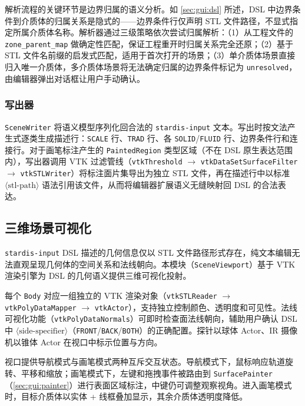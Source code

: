 解析流程的关键环节是边界归属的语义分析。如 \ref{sec:gui:dsl} 所述，DSL 中边界条件到介质体的归属关系是隐式的——边界条件行仅声明 STL 文件路径，不显式指定所属介质体名称。解析器通过三级策略依次尝试归属解析：（1）从工程文件的 \texttt{zone\_parent\_map} 做确定性匹配，保证工程重开时归属关系完全还原；（2）基于 STL 文件名前缀的启发式匹配，适用于首次打开的场景；（3）单介质体场景直接归入唯一介质体，多介质体场景将无法确定归属的边界条件标记为 \texttt{unresolved}，由编辑器弹出对话框让用户手动确认。

\subsubsection{写出器}

\texttt{SceneWriter} 将语义模型序列化回合法的 \texttt{stardis-input} 文本。写出时按文法产生式逐类生成描述行：\texttt{SCALE} 行、\texttt{TRAD} 行、各 \texttt{SOLID}/\texttt{FLUID} 行、边界条件行和连接行。对于画笔标注产生的 \texttt{PaintedRegion} 类型区域（不在 DSL 原生表达范围内），写出器调用 VTK 过滤管线（\texttt{vtkThreshold} $\rightarrow$ \texttt{vtkDataSetSurfaceFilter} $\rightarrow$ \texttt{vtkSTLWriter}）将标注面片集导出为独立 STL 文件，再在描述行中以标准 $\langle\text{stl-path}\rangle$ 语法引用该文件，从而将编辑器扩展语义无缝映射回 DSL 的合法表达。

\subsection{三维场景可视化}
\label{sec:gui:viewport}

\texttt{stardis-input} DSL 描述的几何信息仅以 STL 文件路径形式存在，纯文本编辑无法直观呈现几何体的空间关系和法线朝向。本模块（\texttt{SceneViewport}）基于 VTK 渲染引擎为 DSL 的几何语义提供三维可视化投射。

每个 \texttt{Body} 对应一组独立的 VTK 渲染对象（\texttt{vtkSTLReader} $\!\rightarrow\!$ \texttt{vtkPolyDataMapper} $\!\rightarrow\!$ \texttt{vtkActor}），支持独立控制颜色、透明度和可见性。法线可视化功能（\texttt{vtkPolyData\-Normals}）可即时检查面法线朝向，辅助用户确认 DSL 中 $\langle\text{side-specifier}\rangle$（\texttt{FRONT}/\hskip0pt\texttt{BACK}/\hskip0pt\texttt{BOTH}）的正确配置。探针以球体 Actor、IR 摄像机以锥体 Actor 在视口中标示位置与方向。

视口提供导航模式与画笔模式两种互斥交互状态。导航模式下，鼠标响应轨道旋转、平移和缩放；画笔模式下，左键和拖拽事件被路由到 \texttt{SurfacePainter}（\ref{sec:gui:painter}）进行表面区域标注，中键仍可调整观察视角。进入画笔模式时，目标介质体以实体 + 线框叠加显示，其余介质体透明度降低。

